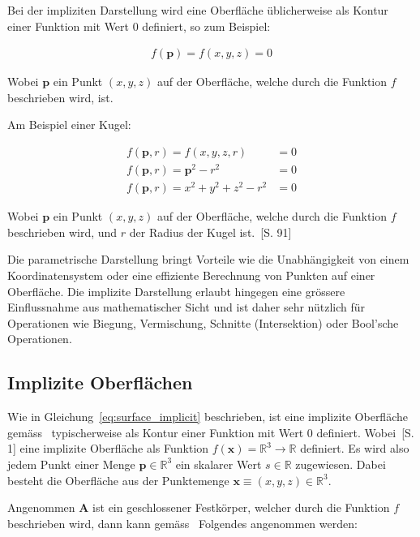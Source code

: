 Bei der impliziten Darstellung wird eine Oberfläche üblicherweise als Kontur
einer Funktion mit Wert 0 definiert, so zum Beispiel:

\begin{gather}\label{eq:surface_implicit}
    f(\bm{p}) = f(x, y, z) = 0
\end{gather}

Wobei $\bm{p}$ ein Punkt $(x, y, z)$ auf der Oberfläche, welche durch die Funktion
$f$ beschrieben wird, ist.

Am Beispiel einer Kugel:

\begin{align}\label{eq:sphere_implicit}
    f(\bm{p}, r) = f(x, y, z, r) &= 0 \\
    f(\bm{p}, r) = \bm{p}^{2} - r^{2} &= 0 \\
    f(\bm{p}, r) = x^{2} + y^{2} + z^{2} - r^{2} &= 0
\end{align}

Wobei $\bm{p}$ ein Punkt $(x, y, z)$ auf der Oberfläche, welche durch die Funktion
$f$ beschrieben wird, und $r$ der Radius der Kugel ist.~\cite{glassner_introduction_1989}[S. 91]

Die parametrische Darstellung bringt Vorteile wie die Unabhängigkeit von einem
Koordinatensystem oder eine effiziente Berechnung von Punkten auf einer
Oberfläche. Die implizite Darstellung erlaubt hingegen eine grössere
Einflussnahme aus mathematischer Sicht und ist daher sehr nützlich für
Operationen wie Biegung, Vermischung, Schnitte (Intersektion) oder Bool'sche
Operationen.

\subsection{Implizite Oberflächen}
\label{subsec:implicit_surfaces}

Wie in Gleichung~\ref{eq:surface_implicit} beschrieben, ist eine implizite
Oberfläche gemäss~\citeauthor{division_introduction} typischerweise als
Kontur einer Funktion mit Wert 0 definiert.
Wobei~\citeauthor{hart_ray_1993}[S. 1] eine implizite Oberfläche als
Funktion $ f(\bm{x}) = \mathbb{R}^{3} \to \mathbb{R} $ definiert.  Es
wird also jedem Punkt einer Menge $ \bm{p} \in \mathbb{R}^{3} $ ein
skalarer Wert $ s \in \mathbb{R} $ zugewiesen. Dabei besteht die
Oberfläche aus der Punktemenge $ \bm{x} \equiv (x, y, z) \in
\mathbb{R}^{3} $.

Angenommen $ \bm{A} $ ist ein geschlossener Festkörper, welcher durch die
Funktion $f$ beschrieben wird, dann kann gemäss~\cite{hart_ray_1993} Folgendes
angenommen werden:


